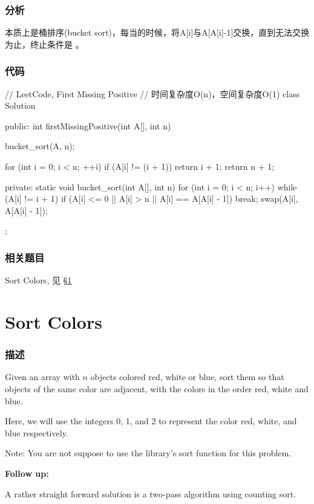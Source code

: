 \subsubsection{分析}
本质上是桶排序(bucket sort)，每当的时候，将A[i]与A[A[i]-1]交换，直到无法交换为止，终止条件是 。


\subsubsection{代码}
\begin{Code}
	// LeetCode, First Missing Positive
	// 时间复杂度O(n)，空间复杂度O(1)
	class Solution {
		public:
		int firstMissingPositive(int A[], int n) {
			bucket_sort(A, n);
			
			for (int i = 0; i < n; ++i)
			if (A[i] != (i + 1))
			return i + 1;
			return n + 1;
		}
		private:
		static void bucket_sort(int A[], int n) {
			for (int i = 0; i < n; i++) {
				while (A[i] != i + 1) {
					if (A[i] <= 0 || A[i] > n || A[i] == A[A[i] - 1])
					break;
					swap(A[i], A[A[i] - 1]);
				}
			}
		}
	};
\end{Code}


\subsubsection{相关题目}
\begindot
\item Sort Colors, 见 \S \ref{sec:sort-colors}
\myenddot


\section{Sort Colors} %
\label{sec:sort-colors}


\subsubsection{描述}
Given an array with $n$ objects colored red, white or blue, sort them so that objects of the same color are adjacent, with the colors in the order red, white and blue.

Here, we will use the integers 0, 1, and 2 to represent the color red, white, and blue respectively.

Note:
You are not suppose to use the library's sort function for this problem.

\textbf{Follow up:}

A rather straight forward solution is a two-pass algorithm using counting sort.

